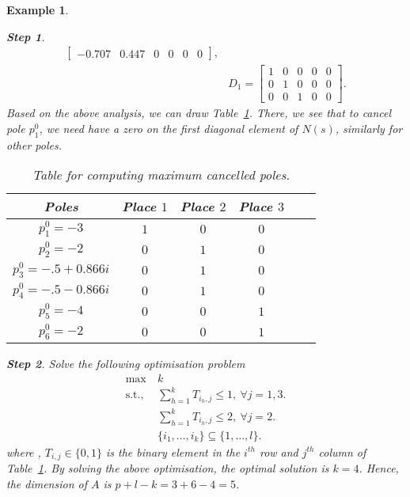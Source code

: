 \documentclass[twocolumn,12pt]{autart}
\theoremstyle{plain}
\newtheorem{example}{Example}
\newtheorem{Steps}{Step}
\begin{document}
\begin{example}
\begin{Steps}
\begin{align*}
\begin{bmatrix}
          -0.707     &        0.447        &         0 & 0 &  0  & 0
 \end{bmatrix},\\
  &D_1 = \begin{bmatrix}
  1 &  0 &  0  & 0 & 0 \\
0  & 1 & 0  & 0  & 0 \\
0 & 0 &  1& 0 & 0
\end{bmatrix}.
\end{align*}
Based on the above analysis, we can draw Table~\ref{table:example1}. There, we see that to cancel pole $p^0_1$, we need have 
a zero on the first diagonal element of $N(s)$, similarly for other poles.

\begin{table}[!]
 \centering
 \begin{tabular}{|c|c|c|c|c|c|}
   \hline
    Poles & Place $1$& Place $2$ & Place $3$\\ \hline
   $p^0_{1}= -3$ & $1$ & $0$ & $0$\\ \hline
   $p^0_{2}= -2$ & $0$ & $1$ &  $0$ \\ \hline
   $p^0_{3}=-.5+0.866i$ &$0$   & $1$  &  $0$\\ \hline
   $p^0_{4}=-.5-0.866i $ & $0$& $1$& $0$\\\hline
   $p^0_{5}=-4$ & $0$ &  $0$  & $1$ \\ \hline
   $p^0_{6}=-2$ &$0$  &$0$  & $1$ \\\hline
  \end{tabular}
\caption{Table for computing maximum cancelled poles.}\label{table:example1}
\end{table}
\end{Steps}



\begin{Steps}
Solve the following optimisation problem
\begin{align*}
\max~ &k \\
\text{s.t.},~&\sum_{h=1}^k T_{i_h,j}  \le 1,~\forall j=1,3.  \\
 ~&\sum_{h=1}^k T_{i_h,j}  \le 2,~\forall j=2.  \\
& \{i_1,\ldots,i_k\}\subseteq \{1,\ldots,l\}.
\end{align*}
where , $T_{i,j}\in\{0,1\}$ is the binary element in the $i^{th}$ row and $j^{th}$ column of Table~\ref{table:example1}. By solving the above optimisation, the optimal solution is $k=4$.  Hence, the dimension of $A$ is $p+l-k=3+6-4=5$. 
\end{Steps}


\end{example}
\end{document}
